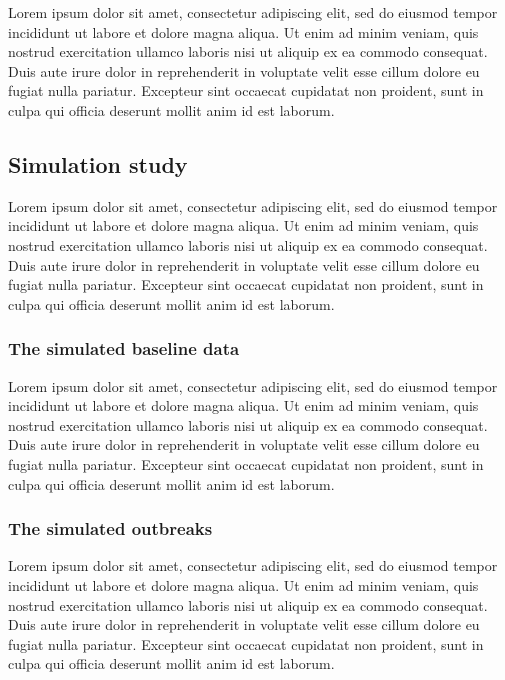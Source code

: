 \documentclass[preprint, 3p,
authoryear]{elsarticle} %
\begin{document}
Lorem ipsum dolor sit amet, consectetur adipiscing elit, sed do eiusmod
tempor incididunt ut labore et dolore magna aliqua. Ut enim ad minim
veniam, quis nostrud exercitation ullamco laboris nisi ut aliquip ex ea
commodo consequat. Duis aute irure dolor in reprehenderit in voluptate
velit esse cillum dolore eu fugiat nulla pariatur. Excepteur sint
occaecat cupidatat non proident, sunt in culpa qui officia deserunt
mollit anim id est laborum.

\hypertarget{simulation-study}{%
\subsection{Simulation study}\label{simulation-study}}

Lorem ipsum dolor sit amet, consectetur adipiscing elit, sed do eiusmod
tempor incididunt ut labore et dolore magna aliqua. Ut enim ad minim
veniam, quis nostrud exercitation ullamco laboris nisi ut aliquip ex ea
commodo consequat. Duis aute irure dolor in reprehenderit in voluptate
velit esse cillum dolore eu fugiat nulla pariatur. Excepteur sint
occaecat cupidatat non proident, sunt in culpa qui officia deserunt
mollit anim id est laborum.

\hypertarget{the-simulated-baseline-data}{%
\subsubsection{The simulated baseline
data}\label{the-simulated-baseline-data}}

Lorem ipsum dolor sit amet, consectetur adipiscing elit, sed do eiusmod
tempor incididunt ut labore et dolore magna aliqua. Ut enim ad minim
veniam, quis nostrud exercitation ullamco laboris nisi ut aliquip ex ea
commodo consequat. Duis aute irure dolor in reprehenderit in voluptate
velit esse cillum dolore eu fugiat nulla pariatur. Excepteur sint
occaecat cupidatat non proident, sunt in culpa qui officia deserunt
mollit anim id est laborum.

\hypertarget{the-simulated-outbreaks}{%
\subsubsection{The simulated outbreaks}\label{the-simulated-outbreaks}}

Lorem ipsum dolor sit amet, consectetur adipiscing elit, sed do eiusmod
tempor incididunt ut labore et dolore magna aliqua. Ut enim ad minim
veniam, quis nostrud exercitation ullamco laboris nisi ut aliquip ex ea
commodo consequat. Duis aute irure dolor in reprehenderit in voluptate
velit esse cillum dolore eu fugiat nulla pariatur. Excepteur sint
occaecat cupidatat non proident, sunt in culpa qui officia deserunt
mollit anim id est laborum.
\end{document}
